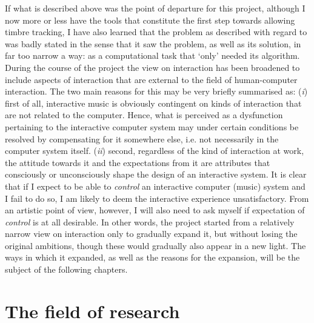 
If what is described above was the point of departure for this project, although I now more or less have the tools that constitute the first step towards allowing timbre tracking, I have also learned that the problem as described with regard to  was badly stated in the sense that it saw the problem, as well as its solution, in far too narrow a way: as a computational task that `only' needed its algorithm. During the course of the project the view on interaction has been broadened to include aspects of interaction that are external to the field of human-computer interaction. The two main reasons for this may be very briefly summarised as:
(\textit{i}) first of all, interactive music is obviously contingent on kinds of interaction that are not related to the computer. Hence, what is perceived as a dysfunction pertaining to the interactive computer system may under certain conditions be resolved by compensating for it somewhere else, i.e. not necessarily in the computer system itself.
(\textit{ii}) \hypertarget{sec:target:personal-background-3}{second}, regardless of the kind of interaction at work, the attitude towards it and the expectations from it are attributes that consciously or unconsciously shape the design of an interactive system. It is clear that if I expect to be able to \emph{control} an interactive computer (music) system and I fail to do so, I am likely to deem the interactive experience unsatisfactory. From an artistic point of view, however, I will also need to ask myself if expectation of \emph{control} is at all desirable.
In other words, the project started from a relatively narrow view on interaction only to gradually expand it, but without losing the original ambitions, though these would gradually also appear in a new light. The ways in which it expanded, as well as the reasons for the expansion, will be the subject of the following chapters.

\section{The field of research}
\label{sec:summary}

